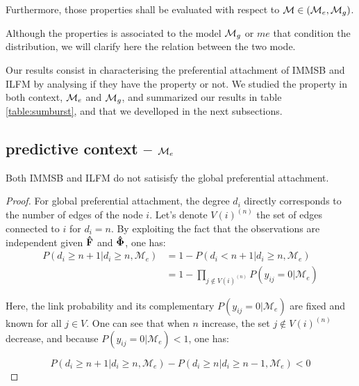 Furthermore, those properties shall be evaluated with respect to $\mathcal{M} \in (\mathcal{M}_e, \mathcal{M}_g)$.

Although the properties is associated to the model $\mathcal{M}_g$ or $me$ that condition the distribution, we will clarify here the relation between the two mode.

%
%
%


Our results consist in characterising the preferential attachment of IMMSB and ILFM by analysing if they have the property or not. We studied the property in both context, $\mathcal{M}_e$ and $\mathcal{M}_g$, and summarized our results in table \ref{table:sumburst}, and that we develloped in the next subsections.


\subsection{predictive context -- $\mathcal{M}_e$}


\begin{proposition}\label{th:gdegree_exp_me}
    Both IMMSB and ILFM do not satisisfy the global preferential attachment.
\end{proposition}
\begin{proof}

For global preferential attachment, the degree $d_i$ directly corresponds to the number of edges of the node $i$. Let's denote $V(i)^{(n)}$ the set of edges connected to $i$ for $d_i = n$. By exploiting the fact that the observations are independent given $\mathbf{\hat{F}}$ and $\mathbf{\hat{\Phi}}$, one has:
%
\begin{align*}
    P(d_i \geq n+1 | d_i \geq n, \mathcal{M}_e) &= 1 - P(d_i < n+1 | d_i \geq n, \mathcal{M}_e) \\
                                 &= 1 - \prod_{j\notin V(i)^{(n)}} P(y_{ij}=0 | \mathcal{M}_e)
\end{align*}

Here, the link probability and its complementary $P(y_{ij}=0 | \mathcal{M}_e)$ are fixed and known for all $j\in V$. One can see that when $n$ increase, the set $j\notin V(i)^{(n)}$ decrease, and because  $P(y_{ij}=0 | \mathcal{M}_e) < 1$, one has: 

\begin{equation*}
    P(d_i \geq n+1 | d_i \geq n, \mathcal{M}_e) -  P(d_i \geq n | d_i \geq n-1, \mathcal{M}_e) < 0
\end{equation*}
\end{proof}




